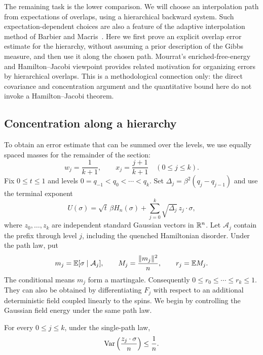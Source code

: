 The remaining task is the lower comparison. We will choose an
interpolation path from expectations of overlaps, using a hierarchical
backward system. Such expectation-dependent choices are also a feature
of the adaptive interpolation method of Barbier and
Macris~\cite{BarbierMacris19}. Here we first prove an explicit overlap
error estimate for the hierarchy, without assuming a prior description
of the Gibbs measure, and then use it along the chosen path.
Mourrat's enriched-free-energy and Hamilton--Jacobi viewpoint
\cite[Section~3, equations~(3.24)--(3.27)]{Mourrat2020} provides related
motivation for organizing errors by hierarchical overlaps. This is a
methodological connection only: the direct covariance and concentration
argument and the quantitative bound here do not invoke a Hamilton--Jacobi
theorem.

\subsection{Concentration along a hierarchy}

To obtain an error estimate that can be summed over the levels, we
use equally spaced masses for the remainder of the section:
\[
 w_j=\frac1{k+1},\qquad x_j=\frac{j+1}{k+1}\quad(0\le j\le k).
\]
Fix $0\le t\le1$ and levels $0=q_{-1}<q_0<\cdots<q_k$.
Set $\Delta_j=\beta^2(q_j-q_{j-1})$ and use the terminal exponent
\begin{equation}\label{static-eq:adaptive-exponent}
 U(\sigma)=\sqrt t\,\beta\widehat H_n(\sigma)
              +\sum_{j=0}^k\sqrt{\Delta_j}\,z_j\cdot\sigma,
\end{equation}
where $z_0,\ldots,z_k$ are independent standard Gaussian vectors in
$\mathbb R^n$. Let $\mathcal A_j$ contain the prefix through level $j$,
including the quenched Hamiltonian disorder. Under the path law, put
\begin{equation}\label{static-eq:hierarchy-means}
 m_j=\mathbb E[\sigma\mid\mathcal A_j],\qquad
 M_j=\frac{\|m_j\|^2}{n},\qquad r_j=\mathbb E M_j.
\end{equation}
The conditional means $m_j$ form a martingale. Consequently
$0\le r_0\le\cdots\le r_k\le1$. They can also be obtained by
differentiating $F_j$ with respect to an additional deterministic field
coupled linearly to the spins. We begin by controlling the Gaussian
field energy under the same path law.

\begin{lemma}\label{static-lem:field-energy}
For every $0\le j\le k$, under the single-path law,
\begin{equation}\label{static-eq:field-energy-concentration}
 \operatorname{Var}\left(\frac{z_j\cdot\sigma}{n}\right)\le\frac1n.
\end{equation}
\end{lemma}

